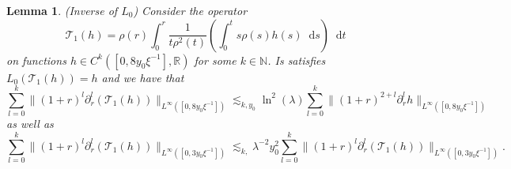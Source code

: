 \documentclass[11 pt]{amsart}
\newtheorem{lem}{Lemma}[section]
\theoremstyle{definition}
\theoremstyle{remark}
\numberwithin{equation}{section}
\newcommand{\dd}{\mathop{}\!\mathrm{d}}
\begin{document}
\begin{lem}
  \label{L0invers}(Inverse of $L_0$) Consider the operator
  \[ \mathcal{T}_1 (h) = \rho (r) \int_0^r \frac{1}{t \rho^2 (t)} \left(
     \int_0^t s \rho (s) h (s) \dd s\right)\dd t \]
  on functions $h \in C^k ([0, 8 y_0 \xi^{- 1}], \mathbb{R})$ for some $k \in
  \mathbb{N}$. Is satisfies $L_0 (\mathcal{T}_1 (h)) = h$ and we have that
  \[ \sum_{l = 0}^k \| (1 + r)^{l} \partial_r^l (\mathcal{T}_1 (h))
     \|_{L^{\infty} ([0, 8y_0 \xi^{- 1}])} \lesssim_{k,y_0} \ln^2 (\lambda) \sum_{l =
     0}^k \| (1 + r)^{2 + l } \partial_r^l h \|_{L^{\infty} ([0, 8 y_0 \xi^{-
     1}])} \]
as well as
\[ \sum_{l = 0}^k \| (1 + r)^l \partial_r^l (\mathcal{T}_1 (h)) \|_{L^{\infty}
   ([0, 3 y_0 \xi^{- 1}])} \lesssim_{k,} \lambda^{-2} y_0^2 \sum_{l = 0}^k \| (1 + r)^l
   \partial_r^l (\mathcal{T}_1 (h)) \|_{L^{\infty} ([0, 3 y_0 \xi^{- 1}])} .
\]
\end{lem}
\end{document}
